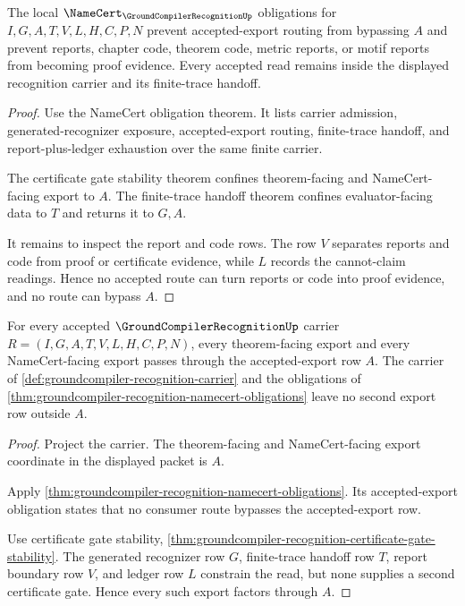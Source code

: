 \begin{theorem}
\label{thm:groundcompiler-recognition-namecert-nonescape}
The local $\NameCert_{\GroundCompilerRecognitionUp}$ obligations for $I,G,A,T,V,L,H,C,P,N$ prevent accepted-export routing from bypassing $A$ and prevent reports, chapter code, theorem code, metric reports, or motif reports from becoming proof evidence. Every accepted read remains inside the displayed recognition carrier and its finite-trace handoff.
\end{theorem}
\begin{proof}
Use the NameCert obligation theorem. It lists carrier admission, generated-recognizer exposure, accepted-export routing, finite-trace handoff, and report-plus-ledger exhaustion over the same finite carrier.

The certificate gate stability theorem confines theorem-facing and NameCert-facing export to $A$. The finite-trace handoff theorem confines evaluator-facing data to $T$ and returns it to $G,A$.

It remains to inspect the report and code rows. The row $V$ separates reports and code from proof or certificate evidence, while $L$ records the cannot-claim readings. Hence no accepted route can turn reports or code into proof evidence, and no route can bypass $A$.
\end{proof}

\begin{theorem}
\label{thm:groundcompiler-recognition-accepted-export-totality}
For every accepted $\GroundCompilerRecognitionUp$ carrier $R=(I,G,A,T,V,L,H,C,P,N)$, every theorem-facing export and every NameCert-facing export passes through the accepted-export row $A$. The carrier of \autoref{def:groundcompiler-recognition-carrier} and the obligations of \autoref{thm:groundcompiler-recognition-namecert-obligations} leave no second export row outside $A$.
\end{theorem}
\begin{proof}
Project the carrier. The theorem-facing and NameCert-facing export coordinate in the displayed packet is $A$.

Apply \autoref{thm:groundcompiler-recognition-namecert-obligations}. Its accepted-export obligation states that no consumer route bypasses the accepted-export row.

Use certificate gate stability, \autoref{thm:groundcompiler-recognition-certificate-gate-stability}. The generated recognizer row $G$, finite-trace handoff row $T$, report boundary row $V$, and ledger row $L$ constrain the read, but none supplies a second certificate gate. Hence every such export factors through $A$.
\end{proof}

